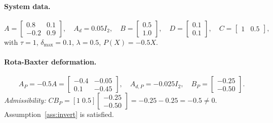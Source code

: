\documentclass[10pt]{amsart}
\numberwithin{equation}{section}
\begin{document}
\paragraph{System data.}
\[
A = \begin{bmatrix} 0.8 & 0.1 \\ -0.2 & 0.9 \end{bmatrix}, \quad
A_d = 0.05 I_2, \quad
B = \begin{bmatrix} 0.5 \\ 1.0 \end{bmatrix}, \quad
D = \begin{bmatrix} 0.1 \\ 0.1 \end{bmatrix}, \quad
C = \begin{bmatrix} 1 & 0.5 \end{bmatrix},
\]
with $\tau=1$, $\delta_{\max}=0.1$, $\lambda=0.5$, $P(X)=-0.5X$.

\paragraph{Rota-Baxter deformation.}
\[
A_P = -0.5 A = \begin{bmatrix} -0.4 & -0.05 \\ 0.1 & -0.45 \end{bmatrix}, \quad
A_{d,P} = -0.025 I_2, \quad
B_P = \begin{bmatrix} -0.25 \\ -0.50 \end{bmatrix}.
\]
\textit{Admissibility:}
$CB_P = [1\;0.5]\begin{bmatrix}-0.25\\-0.50\end{bmatrix}
= -0.25 - 0.25 = -0.5 \neq 0$.
Assumption~\ref{ass:invert} is satisfied.
\end{document}
